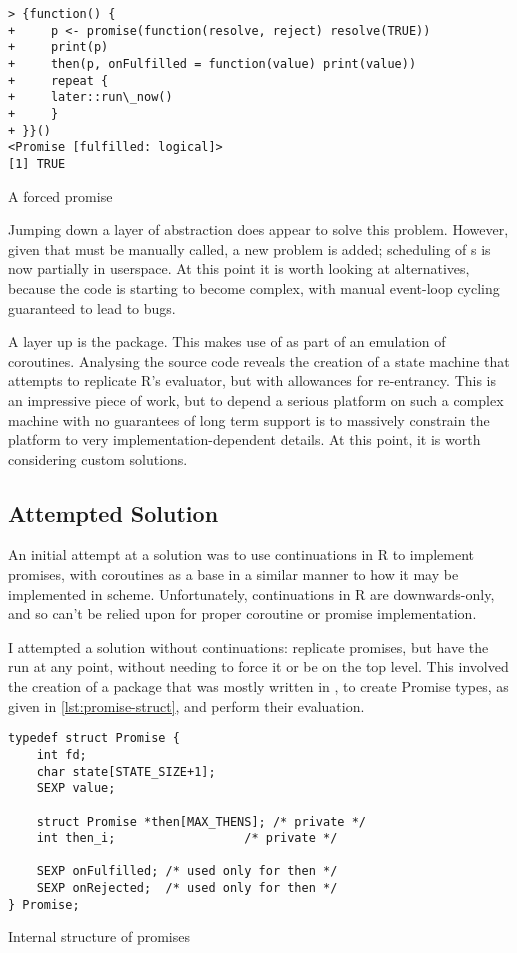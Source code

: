 \begin{listing}
\begin{verbatim}
> {function() {
+     p <- promise(function(resolve, reject) resolve(TRUE))
+     print(p)
+     then(p, onFulfilled = function(value) print(value))
+     repeat {
+     later::run\_now()
+     }
+ }}()
<Promise [fulfilled: logical]>
[1] TRUE
\end{verbatim}
\caption{A forced promise}
\label{lst:promise-forced}
\end{listing}

Jumping down a layer of abstraction does appear to solve this problem.
However, given that  must be manually called, a new problem is added; scheduling of s is now partially in userspace.
At this point it is worth looking at alternatives, because the code is starting to become complex, with manual event-loop cycling guaranteed to lead to bugs.

A layer up is the  package\cite{henry21coro}.
This makes use of  as part of an emulation of coroutines.
Analysing the source code reveals the creation of a state machine that attempts to replicate R's evaluator, but with allowances for re-entrancy.
This is an impressive piece of work, but to depend a serious platform on such a complex machine with no guarantees of long term support is to massively constrain the platform to very implementation-dependent details.
At this point, it is worth considering custom solutions.

\subsection{Attempted Solution}

An initial attempt at a solution was to use continuations in R to implement promises, with coroutines as a base in a similar manner to how it may be implemented in scheme.
Unfortunately, continuations in R are downwards-only, and so can't be relied upon for proper coroutine or promise implementation.

I attempted a solution without continuations: replicate promises, but have the  run at any point, without needing to force it or be on the top level.
This involved the creation of a package that was mostly written in , to create Promise types, as given in \cref{lst:promise-struct}, and perform their evaluation.

\begin{listing}
\begin{verbatim}
typedef struct Promise {
    int fd;
    char state[STATE_SIZE+1];
    SEXP value;

    struct Promise *then[MAX_THENS]; /* private */
    int then_i;		             /* private */

    SEXP onFulfilled; /* used only for then */
    SEXP onRejected;  /* used only for then */
} Promise;
\end{verbatim}
\caption{Internal structure of promises}
\label{lst:promise-struct}
\end{listing}

